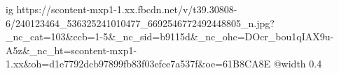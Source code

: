  
 
 
 
 

\ifcmt
  ig https://scontent-mxp1-1.xx.fbcdn.net/v/t39.30808-6/240123464_536325241010477_6692546772492448805_n.jpg?_nc_cat=103&ccb=1-5&_nc_sid=b9115d&_nc_ohc=DOcr_bou1qIAX9u-A5z&_nc_ht=scontent-mxp1-1.xx&oh=d1e7792dcb97899fb83f03efce7a537f&oe=61B8CA8E
  @width 0.4
\fi
